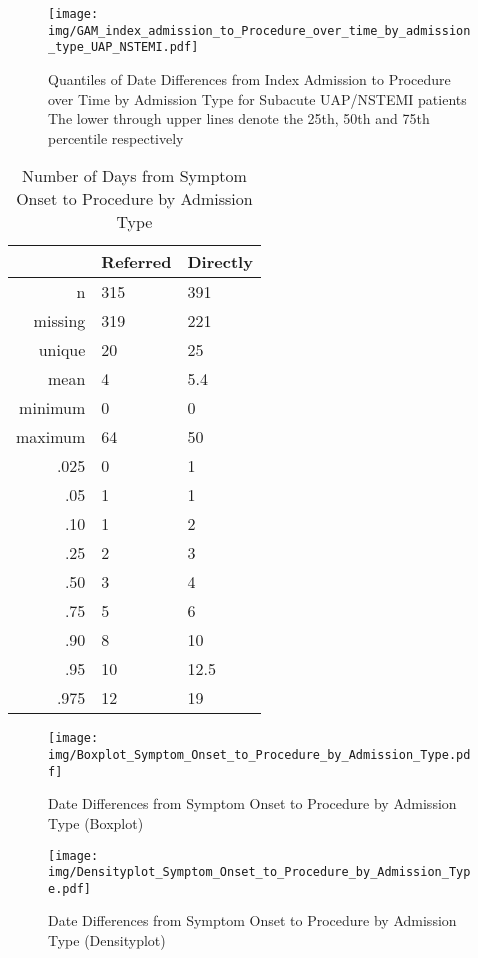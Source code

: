 \documentclass[a4paper]{report}
\begin{document}
\begin{itemize}
{\begin{figure}
  \centering
  \caption{Quantiles of Date Differences from Index Admission to Procedure over Time by Admission Type for Subacute UAP/NSTEMI patients\\
  The lower through upper lines denote the 25th, 50th and 75th percentile respectively}
  \label{GAM: Date Differences from Index Admission to Procedure over Time by Admission Type UAP+NSTEMI}
\texttt{[image: img/GAM\_index\_admission\_to\_Procedure\_over\_time\_by\_admission\_type\_UAP\_NSTEMI.pdf]}\end{figure}



\begin{table}[ht]
\centering
\begin{tabular}{rll}
  \toprule
 & Referred & Directly \\ 
  \midrule
n & 315 & 391 \\ 
  missing & 319 & 221 \\ 
  unique & 20 & 25 \\ 
  mean & 4 & 5.4 \\ 
  minimum & 0 & 0 \\ 
  maximum & 64 & 50 \\ 
  .025 & 0 & 1 \\ 
  .05 & 1 & 1 \\ 
  .10 & 1 & 2 \\ 
  .25 & 2 & 3 \\ 
  .50 & 3 & 4 \\ 
  .75 & 5 & 6 \\ 
  .90 & 8 & 10 \\ 
  .95 & 10 & 12.5 \\ 
  .975 & 12 & 19 \\ 
   \bottomrule
\end{tabular}
\caption{Number of Days from Symptom Onset to Procedure by Admission Type} 
\end{table}
\begin{figure}
  \centering
  \caption{Date Differences from Symptom Onset to Procedure by Admission Type (Boxplot)}
  \label{Boxplot: Date Differences from Symptom Onset to Procedure by Admission Type}
\texttt{[image: img/Boxplot\_Symptom\_Onset\_to\_Procedure\_by\_Admission\_Type.pdf]}\end{figure}


\begin{figure}
  \centering
  \caption{Date Differences from Symptom Onset to Procedure by Admission Type (Densityplot)}
  \label{Density: Date Differences from Symptom Onset to Procedure by Admission Type}
\texttt{[image: img/Densityplot\_Symptom\_Onset\_to\_Procedure\_by\_Admission\_Type.pdf]}\end{figure}


}
\end{itemize}
\end{document}
